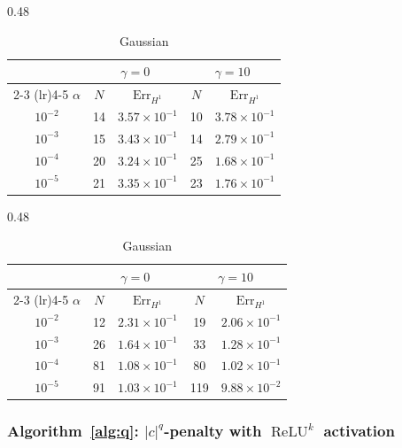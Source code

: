 \documentclass[11pt]{amsart}
\theoremstyle{definition}
\theoremstyle{remark}
\DeclareMathOperator{\relu}{ReLU}
\newcommand{\reluk}{\relu^{k}}
\begin{document}
\begin{table}[htbp]
\centering
\caption{Algorithm~1: effect of $\alpha$ with $\gamma = 0$ vs.\ $\gamma = 10$ ($H^1$ loss).}
\label{tab:alg1_alpha}
\begin{subtable}{0.48\textwidth}
\centering
\setlength{\tabcolsep}{5pt}
\renewcommand{\arraystretch}{1.2}
\begin{tabular}{ccccc}
\toprule
 & \multicolumn{2}{c}{$\gamma = 0$} & \multicolumn{2}{c}{$\gamma = 10$} \\
\cmidrule(lr){2-3} \cmidrule(lr){4-5}
$\alpha$ & $N$ & $\mathrm{Err}_{H^1}$ & $N$ & $\mathrm{Err}_{H^1}$ \\
\midrule
$10^{-2}$ & 14 & $3.57 \times 10^{-1}$ & 10 & $3.78 \times 10^{-1}$ \\
$10^{-3}$ & 15 & $3.43 \times 10^{-1}$ & 14 & $2.79 \times 10^{-1}$ \\
$10^{-4}$ & 20 & $3.24 \times 10^{-1}$ & 25 & $1.68 \times 10^{-1}$ \\
$10^{-5}$ & 21 & $3.35 \times 10^{-1}$ & 23 & $1.76 \times 10^{-1}$ \\
\bottomrule
\end{tabular}
\caption{Softplus}
\label{tab:alg1_alpha_softplus}
\end{subtable}
\hfill
\begin{subtable}{0.48\textwidth}
\centering
\setlength{\tabcolsep}{5pt}
\renewcommand{\arraystretch}{1.2}
\begin{tabular}{ccccc}
\toprule
 & \multicolumn{2}{c}{$\gamma = 0$} & \multicolumn{2}{c}{$\gamma = 10$} \\
\cmidrule(lr){2-3} \cmidrule(lr){4-5}
$\alpha$ & $N$ & $\mathrm{Err}_{H^1}$ & $N$ & $\mathrm{Err}_{H^1}$ \\
\midrule
$10^{-2}$ & 12 & $2.31 \times 10^{-1}$ & 19 & $2.06 \times 10^{-1}$ \\
$10^{-3}$ & 26 & $1.64 \times 10^{-1}$ & 33 & $1.28 \times 10^{-1}$ \\
$10^{-4}$ & 81 & $1.08 \times 10^{-1}$ & 80 & $1.02 \times 10^{-1}$ \\
$10^{-5}$ & 91 & $1.03 \times 10^{-1}$ & 119 & $9.88 \times 10^{-2}$ \\
\bottomrule
\end{tabular}
\caption{Gaussian}
\label{tab:alg1_alpha_gaussian}
\end{subtable}
\end{table}


\subsubsection{Algorithm~\ref{alg:q}: $|c|^q$-penalty with $\reluk$ activation}
\end{document}
